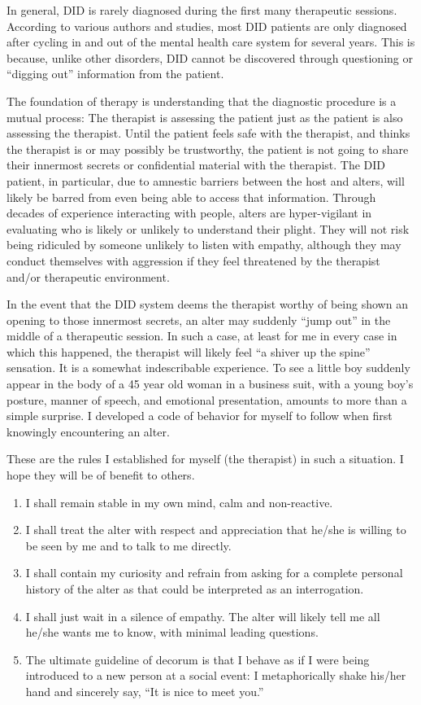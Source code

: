 \documentclass[]{book}
\begin{document}
In general, DID is rarely diagnosed during the first many therapeutic sessions. According to various authors and studies, most DID patients are only diagnosed after cycling in and out of the mental health care system for several years. This is because, unlike other disorders, DID cannot be discovered through questioning or ``digging out'' information from the patient.

The foundation of therapy is understanding that the diagnostic procedure is a mutual process: The therapist is assessing the patient just as the patient is also assessing the therapist. Until the patient feels safe with the therapist, and thinks the therapist is or may possibly be trustworthy, the patient is not going to share their innermost secrets or confidential material with the therapist. The DID patient, in particular, due to amnestic barriers between the host and alters, will likely be barred from even being able to access that information. Through decades of experience interacting with people, alters are hyper-vigilant in evaluating who is likely or unlikely to understand their plight. They will not risk being ridiculed by someone unlikely to listen with empathy, although they may conduct themselves with aggression if they feel threatened by the therapist and/or therapeutic environment.

In the event that the DID system deems the therapist worthy of being shown an opening to those innermost secrets, an alter may suddenly ``jump out'' in the middle of a therapeutic session. In such a case, at least for me in every case in which this happened, the therapist will likely feel ``a shiver up the spine'' sensation. It is a somewhat indescribable experience. To see a little boy suddenly appear in the body of a 45 year old woman in a business suit, with a young boy's posture, manner of speech, and emotional presentation, amounts to more than a simple surprise. I developed a code of behavior for myself to follow when first knowingly encountering an alter.

These are the rules I established for myself (the therapist) in such a situation. I hope they will be of benefit to others.

\begin{enumerate}
\def\labelenumi{\arabic{enumi}.}
\item
  I shall remain stable in my own mind, calm and non-reactive.
\item
  I shall treat the alter with respect and appreciation that he/she is willing to be seen by me and to talk to me directly.
\item
  I shall contain my curiosity and refrain from asking for a complete personal history of the alter as that could be interpreted as an interrogation.
\item
  I shall just wait in a silence of empathy. The alter will likely tell me all he/she wants me to know, with minimal leading questions.
\item
  The ultimate guideline of decorum is that I behave as if I were being introduced to a new person at a social event: I metaphorically shake his/her hand and sincerely say, ``It is nice to meet you.''
\end{enumerate}
\end{document}
